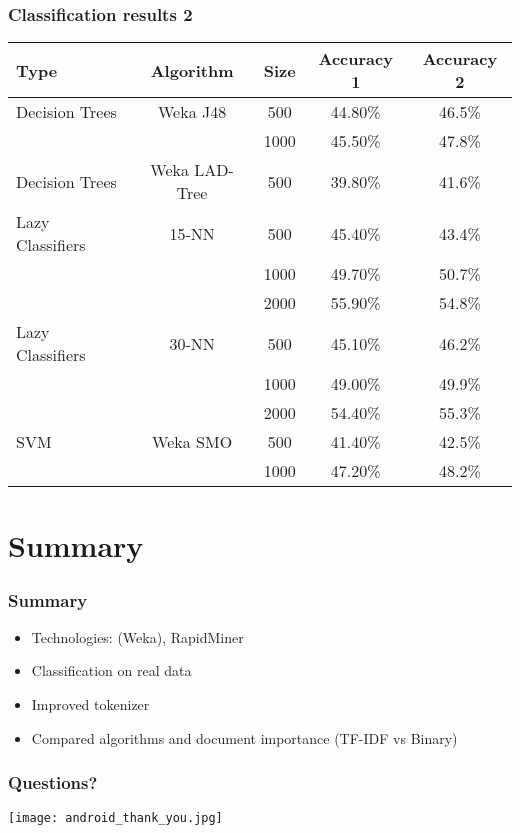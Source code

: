 \begin{frame}\frametitle{Classification results 2} 
\begin{tabular}{|p{2.1cm}|c|c|c|c|}
\hline
Type     &       Algorithm    & Size &   Accuracy 1 & Accuracy 2  \\ \hline
\hline
Decision Trees & Weka J48      &   500  &       44.80\%   &    46.5\% \\
                              &&  1000  &      45.50\%  &    47.8\%\\
Decision Trees & Weka LAD-Tree &   500  &      39.80\%  &    41.6\%\\

Lazy Classifiers & 15-NN &   500  &      45.40\% &    43.4\% \\
                              &&  1000  &      49.70\%  &    50.7\%\\
                              &&  2000  &      55.90\%  &    54.8\%\\
 
Lazy Classifiers & 30-NN  &   500  &      45.10\%  &    46.2\%\\
                              &&  1000  &      49.00\%  &    49.9\%\\
                              &&  2000  &      54.40\%  &    55.3\%\\


SVM & Weka SMO &   500  &      41.40\% &      42.5\% \\
                                     &&  1000  &      47.20\% &      48.2\% \\
\hline
\end{tabular}
\end{frame}

\section{Summary} %
\begin{frame}\frametitle{Summary} 
\begin{itemize}
    \item Technologies: (Weka), RapidMiner 
    \item Classification on real data 
    \item Improved tokenizer 
    \item Compared algorithms and document importance (TF-IDF vs Binary) 
\end{itemize}
\end{frame}


\begin{frame}\frametitle{Questions?} 
\begin{center}
\texttt{[image: android\_thank\_you.jpg]}
\end{center}
\end{frame}
